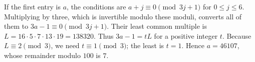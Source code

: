 If the first entry is $a$, the conditions are $a+j\equiv0\pmod{3j+1}$ for $0\le j\le6$. Multiplying by three, which is invertible modulo these moduli, converts all of them to $3a-1\equiv0\pmod{3j+1}$. Their least common multiple is $L=16\cdot5\cdot7\cdot13\cdot19=138320$. Thus $3a-1=tL$ for a positive integer $t$. Because $L\equiv2\pmod3$, we need $t\equiv1\pmod3$; the least is $t=1$. Hence $a=46107$, whose remainder modulo $100$ is $\boxed7$.
